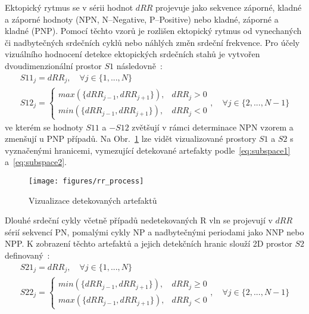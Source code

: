 Ektopický rytmus se v sérii hodnot $dRR$ projevuje jako sekvence záporné, kladné
a záporné hodnoty (NPN, N--Negative, P--Positive) nebo kladné, záporné a
kladné (PNP). Pomocí těchto vzorů je rozlišen ektopický rytmus od vynechaných
či nadbytečných srdečních cyklů nebo náhlých změn srdeční frekvence. 
Pro účely vizuálního hodnocení detekce ektopických
srdečních stahů je vytvořen dvoudimenzionální prostor $S1$
následovně~\cite{Lipponen2019}:
\begin{gather}
    S11_j = dRR_j, \quad \forall j \in \{1,...,N\} \nonumber \\
    S12_j =
    \begin{cases}
        max(\{dRR_{j-1}, dRR_{j+1}\}), & dRR_j > 0 \\
        min(\{dRR_{j-1}, dRR_{j+1}\}), & dRR_j < 0
    \end{cases}
    , \quad \forall j \in \{2,...,N-1\}
    \label{eq:subspace1}
\end{gather}
ve kterém se hodnoty $S11$ a $-S12$ zvětšují v rámci determinace NPN vzorem a
zmenšují u PNP případů. Na Obr.~\ref{fig:rr_process} lze vidět vizualizované
prostory $S1$ a $S2$ s vyznačenými hranicemi, vymezující detekované artefakty
podle~\eqref{eq:subspace1} a~\eqref{eq:subspace2}.

\begin{figure}[h]
    \begin{center}
        \texttt{[image: figures/rr\_process]}
        \caption{Vizualizace detekovaných artefaktů}
        \label{fig:rr_process}
    \end{center}
\end{figure}

Dlouhé srdeční cykly včetně případů nedetekovaných R vln se projevují v $dRR$
sérií sekvencí PN, pomalými cykly NP a nadbytečnými periodami jako NNP nebo NPP. K
zobrazení těchto artefaktů a jejich detekčních hranic slouží 2D prostor $S2$
definovaný~\cite{Lipponen2019}:
\begin{gather}
    S21_j = dRR_j, \quad \forall j \in \{1,...,N\} \nonumber \\
    S22_j =
    \begin{cases}
        min(\{dRR_{j-1}, dRR_{j+1}\}), & dRR_j \geq 0 \\
        max(\{dRR_{j-1}, dRR_{j+1}\}), & dRR_j < 0
    \end{cases}
    , \quad \forall j \in \{2,...,N-1\}
    \label{eq:subspace2}
\end{gather}

